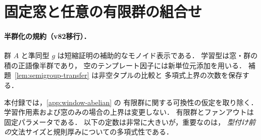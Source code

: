 \section{固定窓と任意の有限群の組合せ}
\label{app:window-group}


\paragraph{半群化の規約（v82移行）．}
群 $A$ と準同型 $g$ は短縮証明の補助的なモノイド表示である．
学習型は窓・群の積の正語像半群であり，
空のテンプレート因子には新単位元添加を用いる．
補題~\ref{lem:semigroup-transfer} は非空タプルの比較と
多項式上界の次数を保存する．


本付録では，\ref{app:window-abelian} の
有限群に関する可換性の仮定を取り除く．
学習作用素および窓のみの場合の上界は変更しない．
有限群とファンアウトは固定パラメータである．
以下の定数は非常に大きいが，重要なのは，
\emph{型付け前の}文法サイズと規則厚みについての多項式性である．

